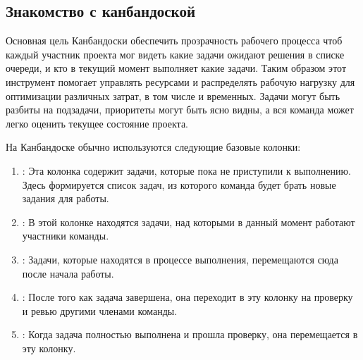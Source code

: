 \documentclass[letterpaper,10pt,russian]{sphinxmanual}
\begin{document}
\subsection{Знакомство с канбан\sphinxhyphen{}доской}
\label{\detokenize{educational_materials/team_work_on_a_project/content:id1}}
\sphinxAtStartPar
{}
Основная цель Канбан\sphinxhyphen{}доски \sphinxhyphen{} обеспечить прозрачность рабочего процесса чтоб каждый участник проекта мог видеть какие задачи ожидают решения в списке очереди, и кто в текущий момент выполняет какие задачи. Таким образом этот инструмент помогает управлять ресурсами и распределять рабочую нагрузку для оптимизации различных затрат, в том числе и временных. Задачи могут быть разбиты на подзадачи, приоритеты могут быть ясно видны, а вся команда может легко оценить текущее состояние проекта.

\sphinxAtStartPar
На Канбан\sphinxhyphen{}доске обычно используются следующие базовые колонки:
\begin{enumerate}
%
\item {} 
\sphinxAtStartPar
{}: Эта колонка содержит задачи, которые пока не приступили к выполнению. Здесь формируется список задач, из которого команда будет брать новые задания для работы.

\item {} 
\sphinxAtStartPar
{}: В этой колонке находятся задачи, над которыми в данный момент работают участники команды.

\item {} 
\sphinxAtStartPar
{}: Задачи, которые находятся в процессе выполнения, перемещаются сюда после начала работы.

\item {} 
\sphinxAtStartPar
{}: После того как задача завершена, она переходит в эту колонку на проверку и ревью другими членами команды.

\item {} 
\sphinxAtStartPar
{}: Когда задача полностью выполнена и прошла проверку, она перемещается в эту колонку.

\end{enumerate}
\end{document}
